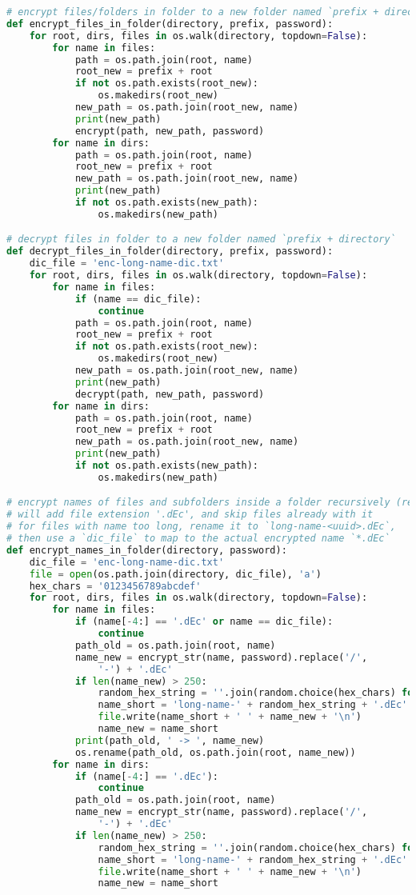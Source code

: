 \begin{lstlisting}[language=python,caption=encrypt.py]
# encrypt files/folders in folder to a new folder named `prefix + directory`
def encrypt_files_in_folder(directory, prefix, password):
	for root, dirs, files in os.walk(directory, topdown=False):
		for name in files:
			path = os.path.join(root, name)
			root_new = prefix + root
			if not os.path.exists(root_new):
				os.makedirs(root_new)
			new_path = os.path.join(root_new, name)
			print(new_path)
			encrypt(path, new_path, password)
		for name in dirs:
			path = os.path.join(root, name)
			root_new = prefix + root
			new_path = os.path.join(root_new, name)
			print(new_path)
			if not os.path.exists(new_path):
				os.makedirs(new_path)

# decrypt files in folder to a new folder named `prefix + directory`
def decrypt_files_in_folder(directory, prefix, password):
	dic_file = 'enc-long-name-dic.txt'
	for root, dirs, files in os.walk(directory, topdown=False):
		for name in files:
			if (name == dic_file):
				continue
			path = os.path.join(root, name)
			root_new = prefix + root
			if not os.path.exists(root_new):
				os.makedirs(root_new)
			new_path = os.path.join(root_new, name)
			print(new_path)
			decrypt(path, new_path, password)
		for name in dirs:
			path = os.path.join(root, name)
			root_new = prefix + root
			new_path = os.path.join(root_new, name)
			print(new_path)
			if not os.path.exists(new_path):
				os.makedirs(new_path)

# encrypt names of files and subfolders inside a folder recursively (rename)
# will add file extension '.dEc', and skip files already with it
# for files with name too long, rename it to `long-name-<uuid>.dEc`,
# then use a `dic_file` to map to the actual encrypted name `*.dEc`
def encrypt_names_in_folder(directory, password):
	dic_file = 'enc-long-name-dic.txt'
	file = open(os.path.join(directory, dic_file), 'a')
	hex_chars = '0123456789abcdef'
	for root, dirs, files in os.walk(directory, topdown=False):
		for name in files:
			if (name[-4:] == '.dEc' or name == dic_file):
				continue
			path_old = os.path.join(root, name)
			name_new = encrypt_str(name, password).replace('/',
				'-') + '.dEc'
			if len(name_new) > 250:
				random_hex_string = ''.join(random.choice(hex_chars) for _ in range(32))
				name_short = 'long-name-' + random_hex_string + '.dEc'
				file.write(name_short + ' ' + name_new + '\n')
				name_new = name_short
			print(path_old, ' -> ', name_new)
			os.rename(path_old, os.path.join(root, name_new))
		for name in dirs:
			if (name[-4:] == '.dEc'):
				continue
			path_old = os.path.join(root, name)
			name_new = encrypt_str(name, password).replace('/',
				'-') + '.dEc'
			if len(name_new) > 250:
				random_hex_string = ''.join(random.choice(hex_chars) for _ in range(32))
				name_short = 'long-name-' + random_hex_string + '.dEc'
				file.write(name_short + ' ' + name_new + '\n')
				name_new = name_short
				

\end{lstlisting}
